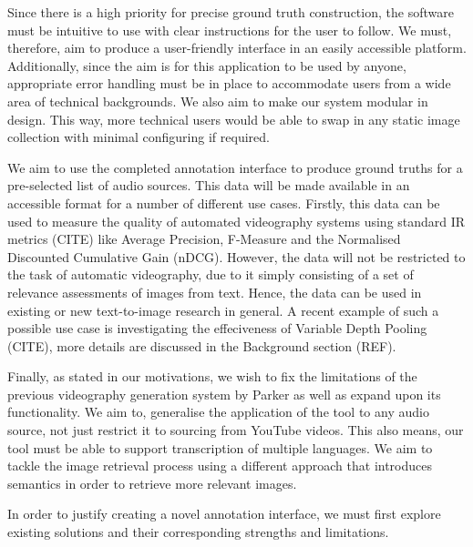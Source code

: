 \documentclass{l4proj}
\begin{document}
Since there is a high priority for precise ground truth construction, the software must be intuitive to use with clear instructions for the user to follow. We must, therefore, aim to produce a user-friendly interface in an easily accessible platform. Additionally, since the aim is for this application to be used by anyone, appropriate error handling must be in place to accommodate users from a wide area of technical backgrounds. We also aim to make our system modular in design. This way, more technical users would be able to swap in any static image collection with minimal configuring if required.

We aim to use the completed annotation interface to produce ground truths for a pre-selected list of audio sources. This data will be made available in an accessible format for a number of different use cases. Firstly, this data can be used to measure the quality of automated videography systems using standard IR metrics (CITE) like Average Precision, F-Measure and the Normalised Discounted Cumulative Gain (nDCG). However, the data will not be restricted to the task of automatic videography, due to it simply consisting of a set of relevance assessments of images from text. Hence, the data can be used in existing or new text-to-image research in general. A recent example of such a possible use case is investigating the effeciveness of Variable Depth Pooling (CITE), more details are discussed in the Background section (REF).

Finally, as stated in our motivations, we wish to fix the limitations of the previous videography generation system by Parker as well as expand upon its functionality. We aim to, generalise the application of the tool to any audio source, not just restrict it to sourcing from YouTube videos. This also means, our tool must be able to support transcription of multiple languages. We aim to tackle the image retrieval process using a different approach that introduces semantics in order to retrieve more relevant images.

In order to justify creating a novel annotation interface, we must first explore existing solutions and their corresponding strengths and limitations.


\end{document}
